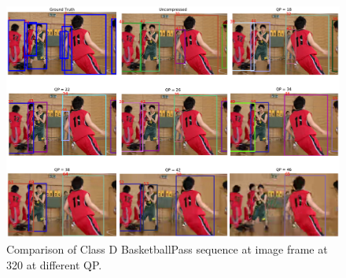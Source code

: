 \begin{figure}[!htbp]
  \centering
  \includegraphics[width=1.0\linewidth]{img/BasketballPass_0_frame320.pdf}
  \caption[Comparison of Class D BasketballPass image frames at 320 at different QP]
  {
  Comparison of Class D BasketballPass sequence at image frame at 320 at different QP.
  }
  \label{fig:BasketballPass_0_frame320}
\end{figure}